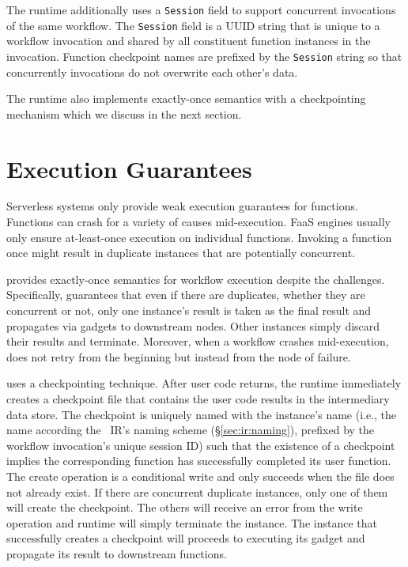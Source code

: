 The runtime additionally uses a \texttt{Session} field to support concurrent
invocations of the same workflow. The \texttt{Session} field is a UUID string
that is unique to a workflow invocation and shared by all constituent function
instances in the invocation. Function checkpoint names are prefixed by the
\texttt{Session} string so that concurrently invocations do not overwrite each
other's data.

The \name{} runtime also implements exactly-once semantics with a
checkpointing mechanism which we discuss in the next section.


\section{Execution Guarantees}

Serverless systems only provide weak execution guarantees for functions.
Functions can crash for a variety of causes mid-execution. FaaS engines
usually only ensure at-least-once execution on individual functions. Invoking
a function once might result in duplicate instances that are potentially
concurrent.

\name{} provides exactly-once semantics for workflow execution despite the
challenges. Specifically, \name{} guarantees that even if there are
duplicates, whether they are concurrent or not, only one instance's result is
taken as the final result and propagates via gadgets to downstream nodes.
Other instances simply discard their results and terminate. Moreover, when a
workflow crashes mid-execution, \name{} does not retry from the beginning but
instead from the node of failure.

\name{} uses a checkpointing technique. After user code returns, the \name{}
runtime immediately creates a checkpoint file that contains the user code
results in the intermediary data store. The checkpoint is uniquely named with
the instance's name (i.e., the name according the
\name{}~IR's naming scheme (\S\ref{sec:ir:naming}), prefixed by the workflow
invocation's unique session ID) such that the existence of a checkpoint
implies the corresponding function has successfully completed its user
function. The create operation is a conditional write and only succeeds when
the file does not already exist. If there are concurrent duplicate instances,
only one of them will create the checkpoint. The others will receive an error
from the write operation and \name{} runtime will simply terminate the
instance. The instance that successfully creates a checkpoint will proceeds to
executing its gadget and propagate its result to downstream functions.

